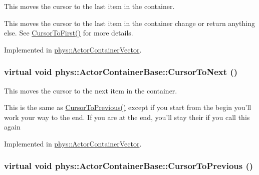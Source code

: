 This moves the cursor to the last item in the container. 

This moves the cursor to the last item in the container change or return anything else. See \hyperlink{classphys_1_1ActorContainerBase_ab1a44758d7c17e70ff2e0f8de47424c3}{CursorToFirst()} for more details. 

Implemented in \hyperlink{classphys_1_1ActorContainerVector_aa6b08266bbb57a22c07ab50514e58db4}{phys::ActorContainerVector}.

\hypertarget{classphys_1_1ActorContainerBase_a1aa337456a4e74cb5740dbae08778072}{
\subsubsection[{CursorToNext}]{\setlength{\rightskip}{0pt plus 5cm}virtual void phys::ActorContainerBase::CursorToNext ()}}
\label{d1/d00/classphys_1_1ActorContainerBase_a1aa337456a4e74cb5740dbae08778072}


This moves the cursor to the next item in the container. 

This is the same as \hyperlink{classphys_1_1ActorContainerBase_a7c424168c0bbd973b283a083714123b3}{CursorToPrevious()} except if you start from the begin you'll work your way to the end. If you are at the end, you'll stay their if you call this again 

Implemented in \hyperlink{classphys_1_1ActorContainerVector_a1c72366a6261d8e98dc0a9d2fad9f70f}{phys::ActorContainerVector}.

\hypertarget{classphys_1_1ActorContainerBase_a7c424168c0bbd973b283a083714123b3}{
\subsubsection[{CursorToPrevious}]{\setlength{\rightskip}{0pt plus 5cm}virtual void phys::ActorContainerBase::CursorToPrevious ()}}
\label{d1/d00/classphys_1_1ActorContainerBase_a7c424168c0bbd973b283a083714123b3}


